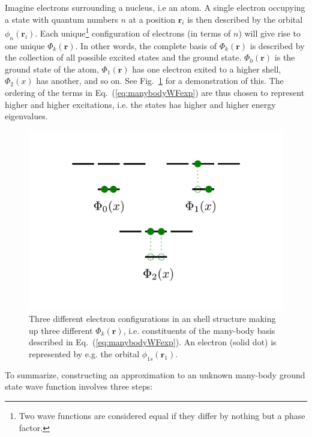 Imagine electrons surrounding a nucleus, i.e an atom. A single electron occupying a state with quantum numbers $n$ at a position $\mathbf{r}_i$ is then described by the orbital $\phi_n(\mathbf{r}_i)$. Each unique\footnote{Two wave functions are considered equal if they differ by nothing but a phase factor.} configuration of electrons (in terms of $n$) will give rise to one unique $\Phi_k(\mathbf{r})$. In other words, the complete basis of $\Phi_k(\mathbf{r})$ is described by the collection of all possible excited states and the ground state. $\Phi_0(\mathbf{r})$ is the ground state of the atom, $\Phi_1(\mathbf{r})$ has one electron exited to a higher shell, $\Phi_2(x)$ has another, and so on. See Fig.~\ref{fig:AtomicOrbitals} for a demonstration of this. The ordering of the terms in Eq.~(\ref{eq:manybodyWFexp}) are thus chosen to represent higher and higher excitations, i.e. the states has higher and higher energy eigenvalues.

\begin{figure}
 \begin{center}
  \includegraphics[scale=0.5]{../Graphics/shellStructure.pdf}
  \caption{Three different electron configurations in an shell structure making up three different $\Phi_k(\mathbf{r})$, i.e. constituents of the many-body basis described in Eq.~(\ref{eq:manybodyWFexp}). An electron (solid dot) is represented by e.g. the orbital $\phi_{1s}(\mathbf{r}_1)$.}
  \label{fig:AtomicOrbitals}
 \end{center}
\end{figure}

To summarize, constructing an approximation to an unknown many-body ground state wave function involves three steps:

